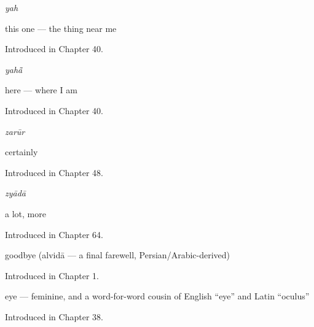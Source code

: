 \noindent\begin{minipage}[t]{\linewidth}
\raggedright
\textbf{}\enspace\emph{yah}\par
\small this one — the thing near me\par
\footnotesize Introduced in Chapter 40.
\end{minipage}\par\medskip

\noindent\begin{minipage}[t]{\linewidth}
\raggedright
\textbf{}\enspace\emph{yahā̃}\par
\small here — where I am\par
\footnotesize Introduced in Chapter 40.
\end{minipage}\par\medskip

\noindent\begin{minipage}[t]{\linewidth}
\raggedright
\textbf{}\enspace\emph{zarūr}\par
\small certainly\par
\footnotesize Introduced in Chapter 48.
\end{minipage}\par\medskip

\noindent\begin{minipage}[t]{\linewidth}
\raggedright
\textbf{}\enspace\emph{zyādā}\par
\small a lot, more\par
\footnotesize Introduced in Chapter 64.
\end{minipage}\par\medskip

\noindent\begin{minipage}[t]{\linewidth}
\raggedright
\textbf{}\par
\small goodbye (alvidā — a final farewell, Persian/Arabic-derived)\par
\footnotesize Introduced in Chapter 1.
\end{minipage}\par\medskip

\noindent\begin{minipage}[t]{\linewidth}
\raggedright
\textbf{}\par
\small eye — feminine, and a word-for-word cousin of English \textquotedblleft{}eye\textquotedblright{} and Latin \textquotedblleft{}oculus\textquotedblright{}\par
\footnotesize Introduced in Chapter 38.
\end{minipage}\par\medskip

